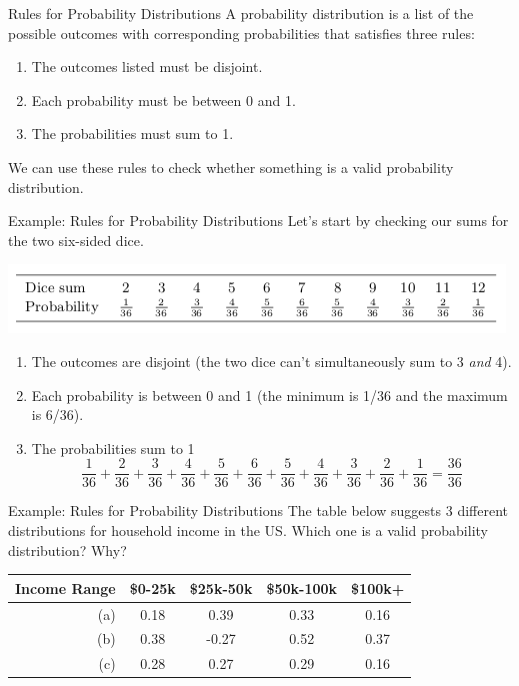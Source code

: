 \begin{frame}{Rules for Probability Distributions}
    A probability distribution is a list of the possible outcomes with corresponding probabilities that satisfies three rules:
    \begin{enumerate}
        \item The outcomes listed must be disjoint.
        \item Each probability must be between 0 and 1.
        \item The probabilities must sum to 1.
    \end{enumerate}
    
    \vspace{12pt}We can use these rules to check whether something is a valid probability distribution.
\end{frame}

\begin{frame}{Example: Rules for Probability Distributions}
    Let's start by checking our sums for the two six-sided dice.
    \vspace{12pt}\begin{center}
        \includegraphics[scale=0.5]{images/sum2d6.png}
    \end{center}
    \begin{enumerate}
        \item The outcomes are disjoint (the two dice can't simultaneously sum to 3 \textit{and} 4).
        \item Each probability is between 0 and 1 (the minimum is 1/36 and the maximum is 6/36).
        \item The probabilities sum to 1
        \[
        \frac{1}{36}+\frac{2}{36}+\frac{3}{36}+\frac{4}{36}+\frac{5}{36}+\frac{6}{36}+\frac{5}{36}+\frac{4}{36}+\frac{3}{36}+\frac{2}{36}+\frac{1}{36}=\frac{36}{36}
        \]
    \end{enumerate}
\end{frame}

\begin{frame}{Example: Rules for Probability Distributions}
    The table below suggests 3 different distributions for household income in the US. Which one is a valid probability distribution? Why?
    
    \vspace{12pt}\begin{tabular}{r|cccc}
        \hline
        Income Range & \$0-25k & \$25k-50k & \$50k-100k & \$100k+ \\ \hline
        (a) & 0.18 & 0.39 & 0.33 & 0.16 \\
        (b) & 0.38 & -0.27 & 0.52 & 0.37 \\
        (c) & 0.28 & 0.27 & 0.29 & 0.16\\ \hline
    \end{tabular}
\end{frame}

